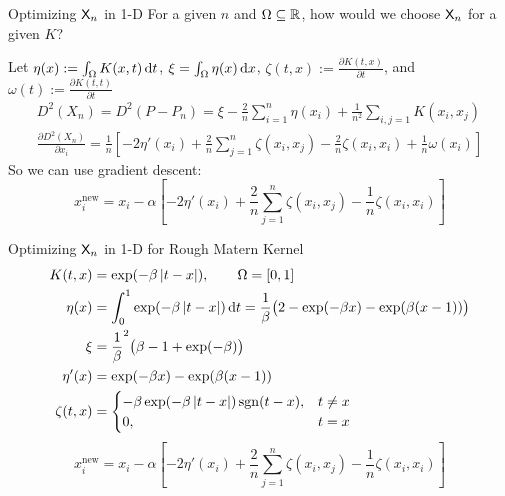 \documentclass[10pt,compress,xcolor={usenames,dvipsnames},aspectratio=169]{beamer}
\begin{document}
\begin{frame}{Optimizing $\mathsf{X}_n$ in 1-D}
	For a given $n$ and $\Omega \subseteq \mathbb{R}$, how would we choose $\mathsf{X}_n$ for a given $K$?  
	
	Let $\eta(x) := \int_\Omega K(x,t) \, {\rm d} t$, $\xi = \int_\Omega \eta(x) \, {\rm d} x$, $\zeta(t,x) := \frac{\partial K(t,x)}{\partial t}$,  and $\omega(t) := \frac{\partial K(t,t)}{\partial t}$
	\begin{gather*}
		 D^2(X_n) = D^2(P-P_n) = \xi - \frac 2{n} \sum_{i=1}^n  \eta(x_i) + \frac 1{n^2} \sum_{i,j=1}K(x_i,x_j) \\
		 \frac{\partial D^2(X_n)}{\partial x_i} = \frac {1}{n} \left [- 2\eta'(x_i)  + \frac 2{n} \sum_{j =1}^n \zeta(x_i,x_j) - \frac 2{n} \zeta(x_i,x_i) + \frac 1{n} \omega(x_i)\right]
	\end{gather*}
So we can use gradient descent:
\[
x_i^{\text{new}} = x_i - \alpha \left [- 2\eta'(x_i)  + \frac 2{n} \sum_{j =1}^n \zeta(x_i,x_j) - \frac 1{n} \zeta(x_i,x_i) \right]
\]
\end{frame}

\begin{frame}{Optimizing $\mathsf{X}_n$ in 1-D for Rough Matern Kernel}
	\vspace{-5ex}
	\begin{align*}
		K(t,x) &= \exp(-\beta \left \lvert t-x \right \rvert), \qquad \Omega = [0,1] \\
		\eta(x) &= \int_0^1 \exp(-\beta \left \lvert t-x \right \rvert) \, {\rm d} t = \frac 1\beta \bigl( 2  - \exp(-\beta x) - \exp(\beta(x-1)) \bigr) \\
		\xi & = \frac 1\beta^2 \bigl(  \beta - 1  + \exp(-\beta) \bigr)\\
		\eta'(x) &= \exp(-\beta x)  - \exp(\beta(x-1)) \\
		\zeta(t,x) & = \begin{cases} -\beta \exp(-\beta \left \lvert t-x \right \rvert) \operatorname{sgn}(t-x) ,& t \ne x\\
			0, & t = x
		\end{cases}
	\end{align*}
	\[
	x_i^{\text{new}} = x_i - \alpha \left [ -2\eta'(x_i)  + \frac 2{n} \sum_{j =1}^n \zeta(x_i,x_j) - \frac 1{n} \zeta(x_i,x_i) \right]
	\]
\end{frame}
\end{document}
